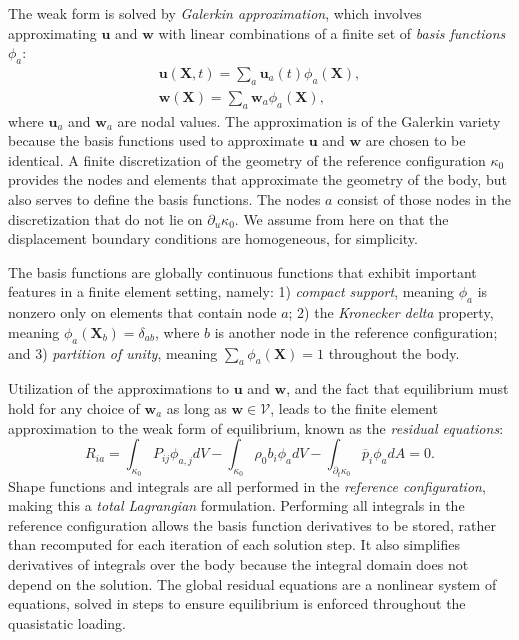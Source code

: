 The weak form is solved by \textit{Galerkin approximation}, which involves approximating $\bm{u}$ and $\bm{w}$ with linear combinations of a finite set of \textit{basis functions} $\phi_a$:
\begin{gather}
\bm{u}(\bm{X},t) = \sum\limits_{a}\bm{u}_a(t)\phi_a(\bm{X}), \\
\bm{w}(\bm{X}) = \sum\limits_{a}\bm{w}_a\phi_a(\bm{X}),
\end{gather}
where $\bm{u}_a$ and $\bm{w}_a$ are nodal values. The approximation is of the Galerkin variety because the basis functions used to approximate $\bm{u}$ and $\bm{w}$ are chosen to be identical. A finite discretization of the geometry of the reference configuration $\kappa_0$ provides the nodes and elements that approximate the geometry of the body, but also serves to define the basis functions. The nodes $a$ consist of those nodes in the discretization that do not lie on $\partial_u\kappa_0$. We assume from here on that the displacement boundary conditions are homogeneous, for simplicity.

The basis functions are globally continuous functions that exhibit important features in a finite element setting, namely: 1) \textit{compact support}, meaning $\phi_a$ is nonzero only on elements that contain node $a$; 2) the \textit{Kronecker delta} property, meaning $\phi_a(\bm{X}_b) = \delta_{ab}$, where $b$ is another node in the reference configuration; and 3) \textit{partition of unity}, meaning $\sum\limits_a\phi_a(\bm{X}) = 1$ throughout the body.

Utilization of the approximations to $\bm{u}$ and $\bm{w}$, and the fact that equilibrium must hold for any choice of $\bm{w}_a$ as long as $\bm{w} \in \mathcal{V}$, leads to the finite element approximation to the weak form of equilibrium, known as the \textit{residual equations}:
\begin{equation}
R_{ia} = \int_{\kappa_0}P_{ij}\phi_{a,j}dV - \int_{\kappa_0}\rho_0b_i\phi_adV - \int_{\partial_t\kappa_0} \overline{p}_i\phi_adA = 0.
\label{eqn:elresid}
\end{equation}
Shape functions and integrals are all performed in the \textit{reference configuration}, making this a \textit{total Lagrangian} formulation. Performing all integrals in the reference configuration allows the basis function derivatives to be stored, rather than recomputed for each iteration of each solution step. It also simplifies derivatives of integrals over the body because the integral domain does not depend on the solution. The global residual equations are a nonlinear system of equations, solved in steps to ensure equilibrium is enforced throughout the quasistatic loading.


